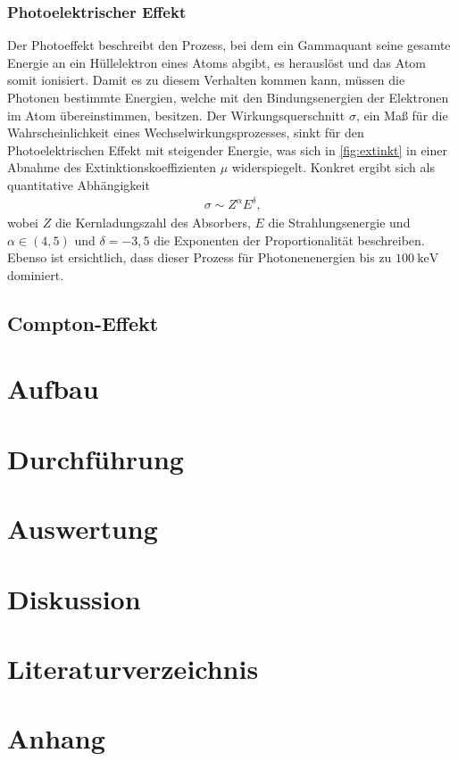 \documentclass[12pt]{article}
\begin{document}
\subsubsection{Photoelektrischer Effekt}
Der Photoeffekt beschreibt den Prozess, bei dem ein Gammaquant seine gesamte Energie an ein Hüllelektron eines Atoms abgibt, es herauslöst und das Atom somit ionisiert. Damit es zu diesem Verhalten kommen kann, müssen die Photonen bestimmte Energien, welche mit den Bindungsenergien der Elektronen im Atom übereinstimmen, besitzen.
Der Wirkungsquerschnitt $\sigma$, ein Maß für die Wahrscheinlichkeit eines Wechselwirkungsprozesses, sinkt für den Photoelektrischen Effekt mit steigender Energie, was sich in \autoref{fig:extinkt} in einer Abnahme des Extinktionskoeffizienten $\mu$ widerspiegelt.
Konkret ergibt sich als quantitative Abhängigkeit 
\begin{align}
  \sigma \sim Z^\alpha E^\delta\text{,}
\end{align}
wobei $Z$ die Kernladungszahl des Absorbers, $E$ die Strahlungsenergie und $\alpha \in(4,5)$ und $\delta = -3,5$ die Exponenten der Proportionalität beschreiben.
Ebenso ist ersichtlich, dass dieser Prozess für Photonenenergien bis zu $\SI{100}{\kilo\electronvolt}$ dominiert.

\subsection{Compton-Effekt}

\section{Aufbau}
\section{Durchführung}\label{sec:durchfuehrung}
\section{Auswertung}\label{sec:auswertung}
\section{Diskussion}\label{sec:diskussion}
\section{Literaturverzeichnis}\label{sec:literaturverzeichnis}
\printbibliography[heading = none]
\newpage

\section{Anhang}\label{sec:anhang}
\end{document}
